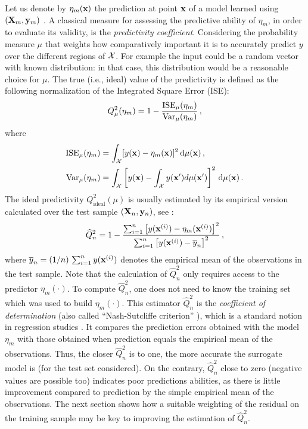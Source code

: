 Let us denote by $\eta_m({\bf x})$ the prediction at point ${\bf x}$ of a model learned using $({\bf X}_m,{\bf y}_m)$ \citep{tibshirani_2009,rasmussen_2006}. 
A classical measure for assessing the predictive ability of $\eta_m$, in order to evaluate its validity, is the \textit{predictivity coefficient}. 
Considering the probability measure $\mu$ that weights how comparatively important it is to accurately predict $y$ over the different regions of $\mathcal{X}$. 
For example the input could be a random vector with known distribution: in that case, this distribution would be a reasonable choice for $\mu$. 
The true (i.e., ideal) value of the predictivity is defined as the following normalization of the Integrated Square Error (ISE): 
\begin{equation}\label{eq:Q2th}
Q_\mu^2(\eta_m) = 1 - \frac{\mathrm{ISE}_\mu(\eta_m)}{\operatorname{Var}_\mu(\eta_m)} \,, 
\end{equation}
where
\begin{align*}
  \mathrm{ISE}_\mu(\eta_m) &= \int_{\mathcal{X}} [y({\bf x})-\eta_m({\bf x})]^2 \, \mathrm{d}\mu({\bf x}) \,, \\
  \operatorname{Var}_\mu(\eta_m) &= \int_{\mathcal{X}} \left[y({\bf x})-\int_{\mathcal{X}} y({\bf x}') d\mu({\bf x}') \right]^2 \, \mathrm{d}\mu({\bf x})\,.
\end{align*}
The ideal predictivity $Q_{\mathrm{ideal}}^2(\mu)$ is usually estimated by its empirical version calculated over the test sample $({\bf X}_n,{\bf y}_n)$, see \cite[p.~32]{daveiga_iooss_2021}: 
\begin{equation}\label{eq:Q2test}
\widehat Q^2_n = 1 - \frac{ \sum_{i=1}^n \left[ y({\bf x}^{(i)})-\eta_m({\bf x}^{(i)})\right]^2}{\sum_{i=1}^n \left[y({\bf x}^{(i)})-\overline{y}_n\right]^2}\,,
\end{equation}
where $\overline{y}_n=(1/n)\,\sum_{i=1}^n y({\bf x}^{(i)})$ denotes the empirical mean of the observations in the test sample. 
Note that the calculation of $\widehat Q^2_n$ only requires access to the predictor $\eta_m(\cdot)$. 
To compute $\widehat Q^2_n$, one does not need to know the training set which was used to build $\eta_m(\cdot)$. 
This estimator $\widehat Q^2_n$ is the \textit{coefficient of determination} (also called ``Nash-Sutcliffe criterion'' \citealp{NashS70}), which is a standard notion in regression studies \citep{klesar00,ioobou10}. 
It compares the prediction errors obtained with the model $\eta_m$ with those obtained when prediction equals the empirical mean of the observations. 
Thus, the closer $\widehat Q^2_n$ is to one, the more accurate the surrogate model is (for the test set considered). 
On the contrary, $\widehat Q^2_n$ close to zero (negative values are possible too) indicates poor predictions abilities, as there is little improvement compared to prediction by the simple empirical mean of the observations. 
The next section shows how a suitable weighting of the residual on the training sample may be key to improving the estimation of $\widehat Q^2_n$. 

